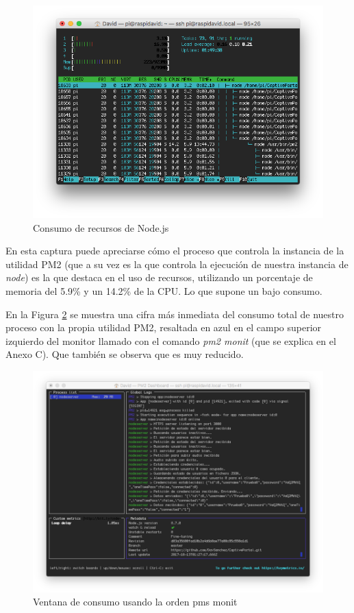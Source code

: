 \begin{figure}[!t]
\begin{center}
\includegraphics[width=0.75\linewidth]{./6_EvalEmpirica/Img/htopNode.png}
\end{center}
\caption{Consumo de recursos de Node.js}
\label{htopNode}
\end{figure}

En esta captura puede apreciarse cómo el proceso que controla la instancia de la utilidad PM2 (que a su vez es la que controla la ejecución de nuestra instancia de \emph{node}) es la que destaca en el uso de recursos, utilizando un porcentaje de memoria del 5.9\% y un 14.2\% de la CPU. Lo que supone un bajo consumo.

En la Figura \ref{pm2monitNode} se muestra una cifra más inmediata del consumo total de nuestro proceso con la propia utilidad PM2, resaltada en azul en el campo superior izquierdo del monitor llamado con el comando \emph{pm2 monit} (que se explica en el Anexo C). Que también se observa que es muy reducido.

\begin{figure}[!t]
\begin{center}
\includegraphics[width=0.75\linewidth]{./6_EvalEmpirica/Img/pm2monitNode.png}
\end{center}
\caption{Ventana de consumo usando la orden pms monit}
\label{pm2monitNode}
\end{figure}

